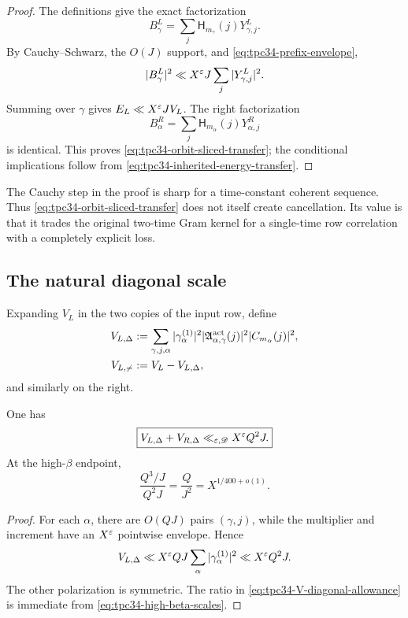 \begin{proof}
The definitions give the exact factorization
\[
 B_\gamma^L
 =\sum_j\mathsf H_{m_\gamma}(j)Y_{\gamma,j}^L.
\]
By Cauchy--Schwarz, the \(O(J)\) support, and
\eqref{eq:tpc34-prefix-envelope},
\[
 |B_\gamma^L|^2
 \ll X^\varepsilon J\sum_j|Y_{\gamma,j}^L|^2.
\]
Summing over \(\gamma\) gives \(E_L\ll X^\varepsilon JV_L\).  The right
factorization
\[
 B_\alpha^R
 =\sum_j\mathsf H_{m_\alpha}(j)Y_{\alpha,j}^R
\]
is identical.  This proves \eqref{eq:tpc34-orbit-sliced-transfer}; the
conditional implications follow from
\eqref{eq:tpc34-inherited-energy-transfer}.
\end{proof}

\begin{remark}
The Cauchy step in the proof is sharp for a time-constant coherent
sequence.  Thus \eqref{eq:tpc34-orbit-sliced-transfer} does not itself
create cancellation.  Its value is that it trades the original two-time
Gram kernel for a single-time row correlation with a completely explicit
loss.
\end{remark}

\subsection{The natural diagonal scale}

Expanding \(V_L\) in the two copies of the input row, define
\begin{align}
 V_{L,\Delta}
 &:=
 \sum_{\gamma,j,\alpha}
 |\gamma_\alpha^{(1)}|^2
 |\mathfrak A_{\alpha,\gamma}^{\rm act}(j)|^2
 |C_{m_\alpha}(j)|^2,
 \label{eq:tpc34-left-V-diagonal}\\
 V_{L,\ne}
 &:=V_L-V_{L,\Delta},
 \label{eq:tpc34-left-V-offdiagonal}
\end{align}
and similarly on the right.

\begin{proposition}
\label{prop:tpc34-V-diagonal}
One has
\begin{equation}
 \boxed{
 V_{L,\Delta}+V_{R,\Delta}
 \ll_{\varepsilon,\mathscr D}X^\varepsilon Q^2J.}
 \label{eq:tpc34-V-diagonal-bound}
\end{equation}
At the high-\(\beta\) endpoint,
\begin{equation}
 \frac{Q^3/J}{Q^2J}
 =\frac{Q}{J^2}
 =X^{1/400+o(1)}.
 \label{eq:tpc34-V-diagonal-allowance}
\end{equation}
\end{proposition}

\begin{proof}
For each \(\alpha\), there are \(O(QJ)\) pairs \((\gamma,j)\), while the
multiplier and increment have an \(X^\varepsilon\) pointwise envelope.  Hence
\[
 V_{L,\Delta}
 \ll X^\varepsilon QJ
 \sum_\alpha|\gamma_\alpha^{(1)}|^2
 \ll X^\varepsilon Q^2J.
\]
The other polarization is symmetric.  The ratio in
\eqref{eq:tpc34-V-diagonal-allowance} is immediate from
\eqref{eq:tpc34-high-beta-scales}.
\end{proof}

